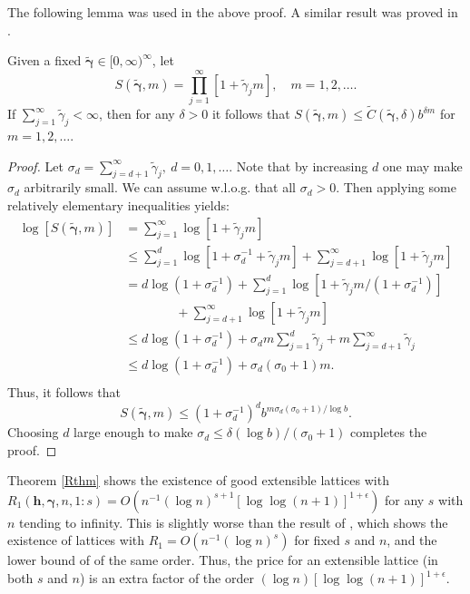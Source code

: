 \documentclass{article}
\renewcommand{\vec}[1]{\ensuremath{\mathbf{#1}}}
\newcommand{\vecsym}[1]{\ensuremath{\boldsymbol{#1}}}
\newcommand{\bfgam}{\vecsym \gamma}
\newcommand{\h}{\vec h}
\begin{document}
The following lemma was used in the above proof.  A similar result was 
proved in \cite{WanHic00b}.

\begin{lemma} \label{boundinfprd} Given a fixed $\tilde{\bfgam} \in
[0,\infty)^{\infty}$, let
$$
S(\tilde{\bfgam},m) = \prod_{j=1}^{\infty} [1 + \tilde{\gamma}_{j} m
], \quad m=1, 2, \ldots.
$$
If $\sum_{j=1}^{\infty} \tilde{\gamma}_{j} < \infty$, then for any
$\delta > 0$ it follows that $S(\tilde{\bfgam},m) \le
\tilde{C}(\tilde{\bfgam},\delta) b^{\delta m}$ for $m=1,2,\ldots$.
\end{lemma}
\begin{proof}
Let $\sigma_{d} = \sum_{j=d+1}^{\infty} \tilde{\gamma}_{j}, \ d=0, 1,
\ldots$.  Note that by increasing $d$ one may make $\sigma_{d}$
arbitrarily small. We can assume w.l.o.g. that all $\sigma_d > 0$.  Then applying some relatively elementary 
inequalities yields:
\begin{align*}
\log[S(\tilde{\bfgam},m)] & = 
\sum_{j=1}^{\infty} \log [1 + \tilde{\gamma}_{j} m ] \\
& \le \sum_{j=1}^{d} \log [1 + 
\sigma_{d}^{-1} + \tilde{\gamma}_{j}
m ] + \sum_{j=d+1}^{\infty} \log [1 + \tilde{\gamma}_{j}
m ] \\
& = d \log(1 + \sigma_{d}^{-1}) + \sum_{j=1}^{d}
\log [1 + \tilde{\gamma}_{j} m/(1 + \sigma_{d}^{-1}) ] \\
& \qquad \qquad +
\sum_{j=d+1}^{\infty} \log [1 + \tilde{\gamma}_{j} m] \\
& \le d \log(1 + \sigma_{d}^{-1}) + \sigma_{d}m 
\sum_{j=1}^{d}
\tilde{\gamma}_{j} +
m \sum_{j=d+1}^{\infty} \tilde{\gamma}_{j} \\
& \le d \log(1 + \sigma_{d}^{-1}) + \sigma_{d} 
(\sigma_{0}+1)m.\\
\end{align*}
Thus, it follows that
$$
S(\tilde{\bfgam},m) \le (1 + \sigma_{d}^{-1})^{d} b^{m\sigma_{d} 
(\sigma_{0}+1)/\log b}.
$$
Choosing $d$ large enough to make $\sigma_{d} \le \delta (\log
b)/(\sigma_{0}+1)$ completes the proof.
\end{proof}

Theorem \ref{Rthm} shows the existence of good extensible lattices
with $R_{1}(\h,\bfgam,n,1:s) = O(n^{-1} (\log n)^{s+1} [\log \log (n+1)]^{1+
\epsilon})$
for any $s$ with $n$ tending to infinity.  This is slightly worse
than the result of \cite[Theorem 5.10]{Nie92}, which shows the
existence of lattices with $R_{1}= O(n^{-1} (\log n)^{s})$ for fixed
$s$ and $n$, and the
lower bound of \cite{Lar87} of the same order.  Thus, the price for an
extensible lattice (in both $s$ and $n$) is an extra factor of the order $(\log n) [\log \log (n+1)]^{1+\epsilon}$.
\end{document}

